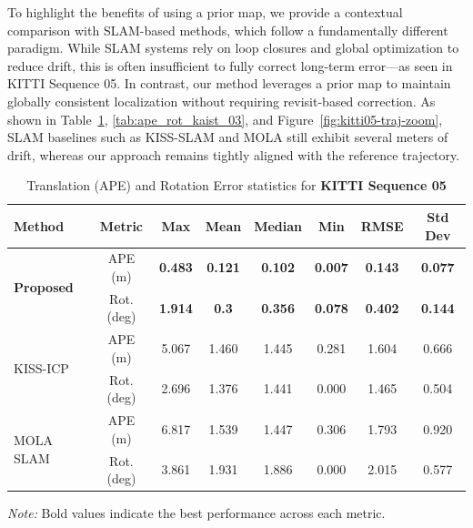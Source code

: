 To highlight the benefits of using a prior map, we provide a contextual comparison with SLAM-based methods, which follow a fundamentally different paradigm. While SLAM systems rely on loop closures and global optimization to reduce drift, this is often insufficient to fully correct long-term error—as seen in KITTI Sequence 05. In contrast, our method leverages a prior map to maintain globally consistent localization without requiring revisit-based correction. As shown in Table~\ref{tab:ape_rot_kitti_seq5}, \ref{tab:ape_rot_kaist_03}, and Figure~\ref{fig:kitti05-traj-zoom}, SLAM baselines such as KISS-SLAM and MOLA still exhibit several meters of drift, whereas our approach remains tightly aligned with the reference trajectory.
\begin{table}[H]
	\centering
	\renewcommand{\arraystretch}{0.6}
	\setlength{\tabcolsep}{15pt}
	\caption{Translation (APE) and Rotation Error statistics for \textbf{KITTI Sequence 05}}
	\label{tab:ape_rot_kitti_seq5}
	
	\begin{adjustbox}{width=\textwidth}
		\begin{tabular}{@{}lccccccc@{}}
			\toprule
			\textbf{Method} & \textbf{Metric} & \textbf{Max} & \textbf{Mean} & \textbf{Median} & \textbf{Min} & \textbf{RMSE} & \textbf{Std Dev} \\
			\midrule
			
			\multirow{2}{*}{\textbf{Proposed}} 
			& APE (m)        & \textbf{0.483}   & \textbf{0.121}   & \textbf{0.102}   & \textbf{0.007}   & \textbf{0.143}   & \textbf{0.077} \\
			& Rot. (deg)     & \textbf{1.914}   & \textbf{0.3}   & \textbf{0.356}   & \textbf{0.078}   & \textbf{0.402}   & \textbf{0.144} \\
			\midrule
			
			\multirow{2}{*}{KISS-ICP} 
			& APE (m)        & 5.067   & 1.460   & 1.445     & 0.281    & 1.604   & 0.666 \\
			& Rot. (deg)     & 2.696   & 1.376   & 1.441     & 0.000    & 1.465   & 0.504 \\
			\midrule
			
			\multirow{2}{*}{MOLA SLAM} 
			& APE (m)        & 6.817   & 1.539   & 1.447     & 0.306    & 1.793   & 0.920 \\
			& Rot. (deg)     & 3.861   & 1.931   & 1.886     & 0.000    & 2.015   & 0.577 \\
			\bottomrule
		\end{tabular}
	\end{adjustbox}
	
	{\footnotesize \textit{Note:} Bold values indicate the best performance across each metric.}
\end{table}

